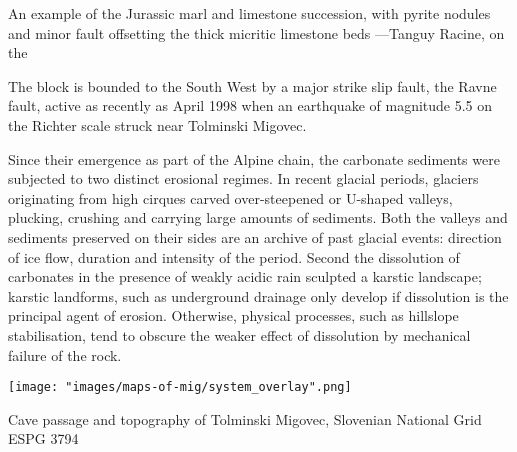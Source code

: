  
\begin{marginfigure}
\checkoddpage \ifoddpage \forcerectofloat \else \forceversofloat \fi
\centering
 \caption{An example of the Jurassic marl and limestone succession, with pyrite nodules and minor fault offsetting the thick micritic limestone beds ---Tanguy Racine, on the \protect{}}
 \label{marls and limestones}
\end{marginfigure}

 The block is bounded to the South West by a major strike slip fault, the Ravne fault, active as recently as April 1998 when an earthquake of magnitude 5.5 on the Richter scale struck near Tolminski Migovec.

Since their emergence as part of the Alpine chain, the carbonate sediments were subjected to two distinct erosional regimes. In recent glacial periods, glaciers originating from high cirques carved over-steepened or U-shaped valleys, plucking, crushing and carrying large amounts of sediments. Both the valleys and sediments preserved on their sides are an archive of past glacial events: direction of ice flow, duration and intensity of the period. Second the dissolution of carbonates in the presence of weakly acidic rain sculpted a karstic landscape; karstic landforms, such as underground drainage only develop if dissolution is the principal agent of erosion. Otherwise, physical processes, such as hillslope stabilisation, tend to obscure the weaker effect of dissolution by mechanical failure of the rock.








\begin{pagemap}
 \checkoddpage \ifoddpage \forcerectofloat \else \forceversofloat \fi
\centering
  \texttt{[image: "images/maps-of-mig/system\_overlay".png]}
  \caption{Cave passage and topography of Tolminski Migovec, Slovenian National Grid ESPG 3794}
   \label{map:map overlay}
 \end{pagemap}


 
